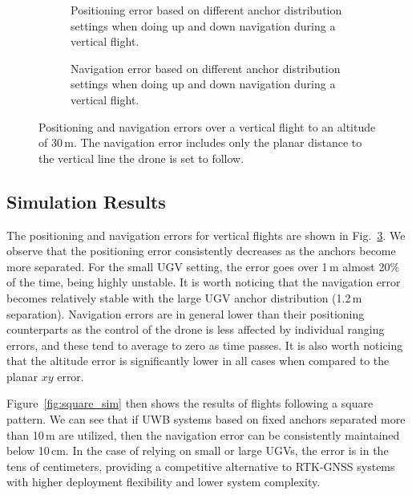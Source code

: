 \begin{figure}
    \centering
    \begin{subfigure}{0.49\textwidth}
        \centering
        \setlength{}
        \setlength{}
        \footnotesize{}
        \caption{Positioning error based on different anchor distribution settings when doing up and down navigation during a vertical flight.}
        \label{fig:up_down_pos}
    \end{subfigure}
    
    \vspace{1em}
    \begin{subfigure}{0.49\textwidth}
        \centering
        \setlength{}
        \setlength{}
        \footnotesize{}
        \caption{Navigation error based on different anchor distribution settings when doing up and down navigation during a vertical flight.}
        \label{fig:up_down_nav}
    \end{subfigure}
    \caption{Positioning and navigation errors over a vertical flight to an altitude of 30\,m. The navigation error includes only the planar distance to the vertical line the drone is set to follow.}
    \label{fig:updown_sim}
\end{figure}

\subsection{Simulation Results}

The positioning and navigation errors for vertical flights are shown in Fig.~\ref{fig:updown_sim}. We observe that the positioning error consistently decreases as the anchors become more separated. For the small UGV setting, the error goes over 1\,m almost 20\% of the time, being highly unstable. It is worth noticing that the navigation error becomes relatively stable with the large UGV anchor distribution (1.2\,m separation). Navigation errors are in general lower than their positioning counterparts as the control of the drone is less affected by individual ranging errors, and these tend to average to zero as time passes. It is also worth noticing that the altitude error is significantly lower in all cases when compared to the planar $xy$ error.

Figure~\ref{fig:square_sim} then shows the results of flights following a square pattern. We can see that if UWB systems based on fixed anchors separated more than 10\,m are utilized, then the navigation error can be consistently maintained below 10\,cm. In the case of relying on small or large UGVs, the error is in the tens of centimeters, providing a competitive alternative to RTK-GNSS systems with higher deployment flexibility and lower system complexity.


